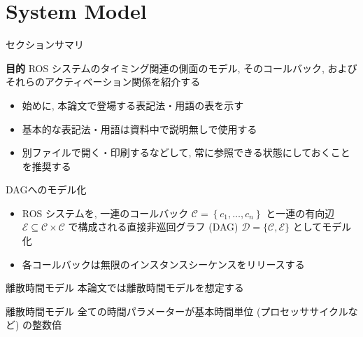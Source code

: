 
\section{System Model}
\label{sec: system model}

\begin{frame}{セクションサマリ}
    \begin{itembox}[l]{\textbf{目的}}
        ROS システムのタイミング関連の側面のモデル, そのコールバック, およびそれらのアクティベーション関係を紹介する
    \end{itembox}
\end{frame}

\begin{frame}{}
    \begin{itemize}
        \item 始めに, 本論文で登場する表記法・用語の表を示す
        \item 基本的な表記法・用語は資料中で説明無しで使用する
        \item 別ファイルで開く・印刷するなどして, 常に参照できる状態にしておくことを推奨する
    \end{itemize}
\end{frame}



\begin{frame}{DAGへのモデル化}
    \begin{itemize}
        \item ROS システムを, 一連のコールバック $\mathcal{C}=\left\{c_{1}, \ldots, c_{n}\right\}$ と一連の有向辺 $\mathcal{E} \subseteq \mathcal{C} \times \mathcal{C}$ で構成される直接非巡回グラフ (DAG) $\mathcal{D}=\{\mathcal{C}, \mathcal{E}\}$ としてモデル化
        \item 各コールバックは無限のインスタンスシーケンスをリリースする
    \end{itemize}
\end{frame}

\begin{frame}{離散時間モデル}
    本論文では離散時間モデルを想定する
    \begin{block}{離散時間モデル}
        全ての時間パラメーターが基本時間単位 (プロセッササイクルなど) の整数倍
    \end{block}
\end{frame}

